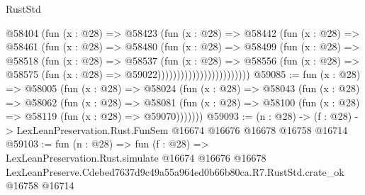 \begin{lexlean}{RustStd}
\begin{coremodule}
                              @58404
                                (fun (x : @28) =>
                                @58423
                                  (fun (x : @28) =>
                                  @58442
                                    (fun (x : @28) =>
                                    @58461
                                      (fun (x : @28) =>
                                      @58480
                                        (fun (x : @28) =>
                                        @58499
                                          (fun (x : @28) =>
                                          @58518
                                            (fun (x : @28) =>
                                            @58537
                                              (fun (x : @28) =>
                                              @58556
                                                (fun (x : @28) =>
                                                @58575
                                                  (fun (x : @28) => @59022))))))))))))))))))))))))
@59085 := fun (x : @28) =>
  @58005
    (fun (x : @28) =>
    @58024
      (fun (x : @28) =>
      @58043
        (fun (x : @28) =>
        @58062
          (fun (x : @28) =>
          @58081 (fun (x : @28) => @58100 (fun (x : @28) => @58119 (fun (x : @28) => @59070)))))))
@59093 := (n : @28) ->
  (f : @28) -> LexLeanPreservation.Rust.FunSem @16674 @16676 @16678 @16758 @16714
@59103 := fun (n : @28) =>
  fun (f : @28) =>
  LexLeanPreservation.Rust.simulate
    @16674
    @16676
    @16678
    LexLeanPreserve.Cdebed7637d9c49a55a964ed0b66b80ca.R7.RustStd.crate_ok
    @16758
    @16714
\end{coremodule}
\end{lexlean}

